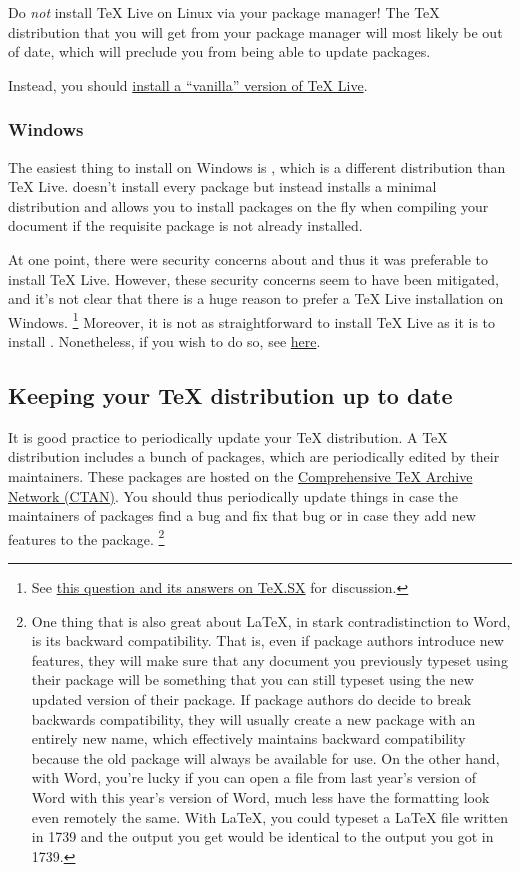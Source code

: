 Do \emph{not} install TeX Live on Linux via your package manager!
The \TeX{} distribution that you will get from your package manager will most likely be out of date, which will preclude you from being able to update packages.

Instead, you should \href{http://tex.stackexchange.com/q/1092/32888}{install a ``vanilla'' version of TeX Live}.

\subsubsection{Windows}
\label{subsubsec:tex-distro:windows}

The easiest thing to install on Windows is , which is a different distribution than TeX Live.
 doesn't install every package but instead installs a minimal distribution and allows you to install packages on the fly when compiling your document if the requisite package is not already installed.

At one point, there were security concerns about  and thus it was preferable to install TeX Live.
However, these security concerns seem to have been mitigated, and it's not clear that there is a huge reason to prefer a TeX Live installation on Windows.%
\footnote{%
See \href{http://tex.stackexchange.com/q/20036/32888}{this question and its answers on TeX.SX} for discussion.%
}
Moreover, it is not as straightforward to install TeX Live as it is to install .
Nonetheless, if you wish to do so, see \href{http://www.tug.org/texlive/acquire-netinstall.html}{here}.

\subsection{Keeping your \TeX{} distribution up to date}
\label{subsec:keeping-your-tex-distro-up-to-date}

It is good practice to periodically update your \TeX{} distribution.
A \TeX{} distribution includes a bunch of packages, which are periodically edited by their maintainers.
These packages are hosted on the \href{http://ctan.org/}{Comprehensive \TeX{} Archive Network (CTAN)}.
You should thus periodically update things in case the maintainers of packages find a bug and fix that bug or in case they add new features to the package.%
\footnote{%
One thing that is also great about \LaTeX, in stark contradistinction to Word, is its backward compatibility.
That is, even if package authors introduce new features, they will make sure that any document you previously typeset using their package will be something that you can still typeset using the new updated version of their package.
If package authors do decide to break backwards compatibility, they will usually create a new package with an entirely new name, which effectively maintains backward compatibility because the old package will always be available for use.
On the other hand, with Word, you're lucky if you can open a file from last year's version of Word with this year's version of Word, much less have the formatting look even remotely the same.
With \LaTeX, you could typeset a \LaTeX{} file written in 1739 and the output you get would be identical to the output you got in 1739.%
}

